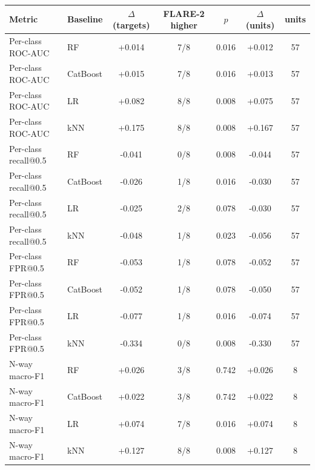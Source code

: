\begin{tabular}{llccccc}
\toprule
Metric & Baseline & $\Delta$ (targets) & FLARE-2 higher & $p$ & $\Delta$ (units) & units \\
\midrule
Per-class ROC-AUC & RF & +0.014 & 7/8 & 0.016 & +0.012 & 57 \\
Per-class ROC-AUC & CatBoost & +0.015 & 7/8 & 0.016 & +0.013 & 57 \\
Per-class ROC-AUC & LR & +0.082 & 8/8 & 0.008 & +0.075 & 57 \\
Per-class ROC-AUC & kNN & +0.175 & 8/8 & 0.008 & +0.167 & 57 \\
Per-class recall@0.5 & RF & -0.041 & 0/8 & 0.008 & -0.044 & 57 \\
Per-class recall@0.5 & CatBoost & -0.026 & 1/8 & 0.016 & -0.030 & 57 \\
Per-class recall@0.5 & LR & -0.025 & 2/8 & 0.078 & -0.030 & 57 \\
Per-class recall@0.5 & kNN & -0.048 & 1/8 & 0.023 & -0.056 & 57 \\
Per-class FPR@0.5 & RF & -0.053 & 1/8 & 0.078 & -0.052 & 57 \\
Per-class FPR@0.5 & CatBoost & -0.052 & 1/8 & 0.078 & -0.050 & 57 \\
Per-class FPR@0.5 & LR & -0.077 & 1/8 & 0.016 & -0.074 & 57 \\
Per-class FPR@0.5 & kNN & -0.334 & 0/8 & 0.008 & -0.330 & 57 \\
N-way macro-F1 & RF & +0.026 & 3/8 & 0.742 & +0.026 & 8 \\
N-way macro-F1 & CatBoost & +0.022 & 3/8 & 0.742 & +0.022 & 8 \\
N-way macro-F1 & LR & +0.074 & 7/8 & 0.016 & +0.074 & 8 \\
N-way macro-F1 & kNN & +0.127 & 8/8 & 0.008 & +0.127 & 8 \\
\bottomrule
\end{tabular}
